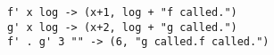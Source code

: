 \begin{verbatim}
f' x log -> (x+1, log + "f called.")
g' x log -> (x+2, log + "g called.")
f' . g' 3 "" -> (6, "g called.f called.")
\end{verbatim}
